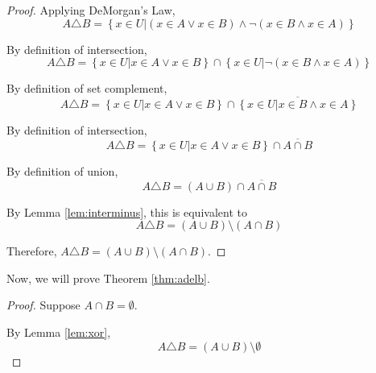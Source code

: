 \documentclass{article}
\begin{document}
\begin{outline}[enumerate]
\begin{proof}
        Applying DeMorgan's Law,
        \begin{equation}
            A \triangle B = \left\{x \in U | 
                (x \in A \vee x \in B)
                \wedge \neg (x \in B \wedge x \in A)
            \right\}
        \end{equation}

        By definition of intersection, 
        \begin{equation}
            A \triangle B = \left\{x \in U | x \in A \vee x \in B\right\} \cap 
            \left\{x \in U | \neg (x \in B \wedge x \in A) \right\}
        \end{equation}

        By definition of set complement, 
        \begin{equation}
            A \triangle B = \left\{x \in U | x \in A \vee x \in B\right\} \cap 
            \overline{\left\{x \in U | x \in B \wedge x \in A \right\}}
        \end{equation}

        By definition of intersection, 
        \begin{equation}
            A \triangle B = \left\{x \in U | x \in A \vee x \in B\right\} \cap 
            \overline{A \cap B}
        \end{equation}

        By definition of union,
        \begin{equation}
            A \triangle B = (A \cup B) \cap \overline{A \cap B}
        \end{equation}

        By Lemma \ref{lem:interminus}, this is equivalent to 
        \begin{equation}
            A \triangle B = (A \cup B) \setminus (A \cap B)
        \end{equation}

        Therefore, $A \triangle B = (A \cup B) \setminus (A \cap B)$.
    \end{proof}

    Now, we will prove Theorem \ref{thm:adelb}.

    \begin{proof}
        Suppose $A \cap B = \emptyset$. 

        By Lemma \ref{lem:xor},
        \begin{equation}
            A \triangle B = (A \cup B) \setminus \emptyset
        \end{equation}


\end{proof}
\end{outline}
\end{document}
